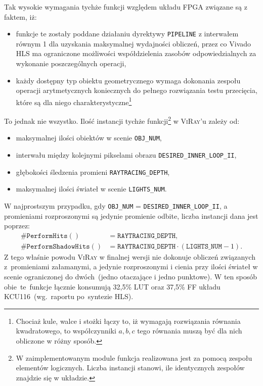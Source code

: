 \begin{enumerate}
Tak wysokie wymagania tychże funkcji względem układu FPGA związane są z faktem, iż:
\begin{itemize}
\item funkcje te zostały poddane działaniu dyrektywy \texttt{PIPELINE} z interwałem równym 1 dla uzyskania maksymalnej wydajności obliczeń, przez co Vivado HLS ma ograniczone możliwości współdzielenia zasobów odpowiedzialnych za wykonanie poszczególnych operacji,
\item każdy dostępny typ obiektu geometrycznego wymaga dokonania zespołu operacji arytmetycznych koniecznych do pełnego rozwiązania testu przecięcia, które są dla niego charakterystyczne\footnote{Chociaż kule, walce i stożki łączy to, iż wymagają rozwiązania równania kwadratowego, to współczynniki $a, b, c$ tego równania muszą być dla nich obliczone w różny sposób.}
\end{itemize}
To jednak nie wszystko. Ilość instancji tychże funkcji\footnote{W zaimplementowanym module funkcja realizowana jest za pomocą zespołu elementów logicznych. Liczba instancji stanowi, ile identycznych zespołów znajdzie się w układzie.} w \textsc{ViRay}'u zależy od:
\begin{itemize}
\item maksymalnej ilości obiektów w scenie \texttt{OBJ\_NUM},
\item interwału między kolejnymi pikselami obrazu \texttt{DESIRED\_INNER\_LOOP\_II},
\item głębokości śledzenia promieni \texttt{RAYTRACING\_DEPTH},
\item maksymalnej ilości świateł w scenie \texttt{LIGHTS\_NUM}.
\end{itemize}
W najprostszym przypadku, gdy \texttt{OBJ\_NUM} = \texttt{DESIRED\_INNER\_LOOP\_II}, a promieniami rozproszonymi są jedynie promienie odbite, liczba instancji dana jest poprzez:
\begin{align*}
\#\mathtt{PerformHits()} &= \mathtt{RAYTRACING\_DEPTH},\\
\#\mathtt{PerformShadowHits()} &= \mathtt{RAYTRACING\_DEPTH} \cdot \left(\mathtt{LIGHTS\_NUM} - 1\right).
\end{align*}
Z tego właśnie powodu \textsc{ViRay} w finalnej wersji nie dokonuje obliczeń związanych z~promieniami załamanymi, a jedynie rozproszonymi i cienia przy ilości świateł w scenie ograniczonej do dwóch~(jedno otaczające i jedno punktowe). W ten sposób obie~te~funkcje łącznie konsumują 32,5\% LUT oraz 37,5\% FF układu KCU116~(wg.~raportu po~syntezie HLS). 


\end{enumerate}
